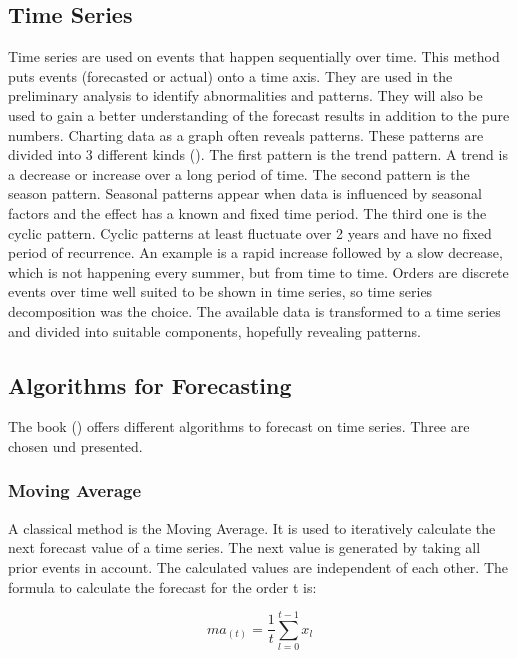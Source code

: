 \subsection{Time Series}\label{subsection:Time Series}
Time series are used on events that happen sequentially over time. This method puts events (forecasted or actual) onto a time axis.
They are used in the preliminary analysis to identify abnormalities and patterns. They will also be used to gain a better understanding of the forecast results in addition to the pure numbers. Charting data as a graph often reveals patterns. These patterns are divided into 3 different kinds (\cite{Hyndman.2013}). The first pattern is the trend pattern. A trend is a decrease or increase over a long period of time. The second pattern is the season pattern. Seasonal patterns appear when data is influenced by seasonal factors and the effect has a known and fixed time period. The third one is the cyclic pattern. Cyclic patterns at least fluctuate over 2 years and have no fixed period of recurrence. An example is a rapid increase followed by a slow decrease, which is not happening every summer, but from time to time.\newline
Orders are discrete events over time well suited to be shown in time series, so time series decomposition was the choice. The available data is transformed to a time series and divided into suitable components, hopefully revealing patterns.
\subsection{Algorithms for Forecasting}\label{subsection:Algorithms for Forecasting}
The book (\cite{Hyndman.2013}) offers different algorithms to forecast on time series. Three are chosen und presented.
\subsubsection{Moving Average}\label{subsubsection:Moving Average}
A classical method is the Moving Average. It is used to iteratively calculate the next forecast value of a time series. The next value is generated by taking all prior events in account. The calculated values are independent of each other.\newline
The formula to calculate the forecast for the order t is:
\begin{center}
\begin{equation}
ma_{(t)}= \frac{1}{t}\sum^{t-1}_{l = 0} x_{l}
\end{equation}
\end{center}

